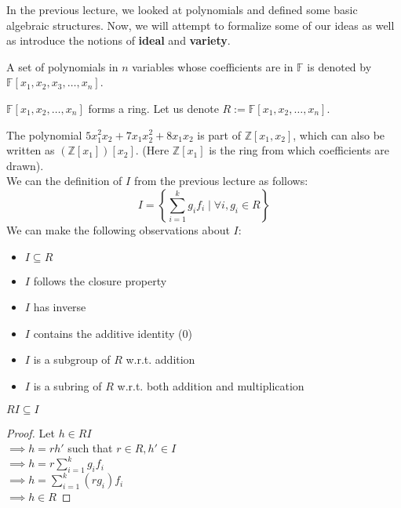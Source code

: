 
In the previous lecture, we looked at polynomials and defined some basic algebraic structures. Now, we will attempt to formalize some of our ideas as well as introduce the notions of \textbf{ideal} and \textbf{variety}.\\

\begin{notation}
A set of polynomials in $n$ variables whose coefficients are in $\mathbb{F}$ is denoted by $\mathbb{F}[x_1,x_2,x_3,\dots,x_n]$.
\end{notation}


\begin{observation}
$\mathbb{F}[x_1,x_2,\ldots,x_n]$ forms a ring. Let us denote $R:=\mathbb{F}[x_1,x_2,\ldots,x_n]$.
\end{observation}

The polynomial $5x_1^2x_2 + 7x_1x_2^2 + 8x_1x_2$ is part of $\mathbb{Z}[x_1,x_2]$, which can also be written as $(\mathbb{Z}[x_1])[x_2]$. (Here $\mathbb{Z}[x_1]$ is the ring from which coefficients are drawn).\\

We can the definition of $I$ from the previous lecture as follows:
\begin{equation}
I = \left\lbrace \sum\limits_{i=1}^{k} g_{i}f_{i}\mid \forall i, g_i \in R\right\rbrace
\end{equation}
We can make the following observations about $I$:
\begin{itemize}
\item $I \subseteq R$
\item $I$ follows the closure property
\item $I$ has inverse
\item $I$ contains the additive identity (0)
\item $I$ is a subgroup of $R$ w.r.t. addition
\item $I$ is a subring of $R$ w.r.t. both addition and multiplication\\
\end{itemize}


\begin{observation}
$RI \subseteq I$ 
\end{observation}
\begin{proof}
Let $h \in RI$\\
$\implies h=rh'$ such that $r \in R, h' \in I$\\
$\implies h=r\sum\limits_{i=1}^{k} g_{i}f_{i}$\\
$\implies h=\sum\limits_{i=1}^{k} (rg_{i})f_{i}$\\
$\implies h \in R$
\end{proof}

